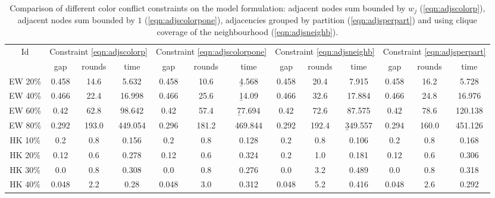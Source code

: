 \begin{table}
\centering

	\begin{tabular}{|c|ccc|ccc|ccc|ccc|}
	\hline
	\multicolumn{1}{|c|}{Id} & \multicolumn{3}{|c|}{Constraint \ref{eqn:adjscolorp}} & \multicolumn{3}{|c|}{Constraint \ref{eqn:adjscolorpone}} & \multicolumn{3}{|c|}{Constraint \ref{eqn:adjsneighb}} & \multicolumn{3}{|c|}{Constraint \ref{eqn:adjsperpart}} 
	\\
	& gap & rounds & time & gap & rounds & time & gap & rounds & time & gap & rounds & time 
	\\
	\hline
	EW 20\% & 0.458 & 14.6 & 5.632 & 0.458 & 10.6 & \b{4.568} & 0.458 & 20.4 & 7.915 & 0.458 & 16.2 & 5.728
	\\
	EW 40\% & 0.466 & 22.4 & 16.998 & 0.466 & 25.6 & \b{14.09} & 0.466 & 32.6 & 17.884 & 0.466 & 24.8 & 16.976
	\\
	EW 60\% & 0.42 & 62.8 & 98.642 & 0.42 & 57.4 & \b{77.694} & 0.42 & 72.6 & 87.575 & 0.42 & 78.6 & 120.138
	\\
	EW 80\% & 0.292 & 193.0 & 449.054 & 0.296 & 181.2 & 469.844 & 0.292 & 192.4 & \b{349.557} & 0.294 & 160.0 & 451.126
	\\
	\hline
	HK 10\% &  0.2 &  0.8 & 0.156 &  0.2 &  0.8 & 0.128 &  0.2 &  0.8 & 0.106 &  0.2 &  0.8 & 0.168
	\\
	HK 20\% & 0.12 &  0.6 & 0.278 & 0.12 &  0.6 & 0.324 &  0.2 &  1.0 & 0.181 & 0.12 &  0.6 & 0.306
	\\
	HK 30\% &  0.0 &  0.8 & 0.308 &  0.0 &  0.8 & 0.276 &  0.0 &  3.2 & 0.489 &  0.0 &  0.8 & 0.318
	\\
	HK 40\% & 0.048 &  2.2 & 0.28 & 0.048 &  3.0 & 0.312 & 0.048 &  5.2 & 0.416 & 0.048 &  2.6 & 0.292
	\\
	\hline 
	 \end{tabular}
	
	\caption{Comparison of different color conflict constraints on the model formulation: adjacent nodes sum bounded by $w_j$ (\ref{eqn:adjscolorp}), adjacent nodes sum bounded by $1$ (\ref{eqn:adjscolorpone}), adjacencies grouped by partition (\ref{eqn:adjsperpart}) and using clique coverage of the neighbourhood (\ref{eqn:adjsneighb}).}
	\label{table:modelsadj}
\end{table}


